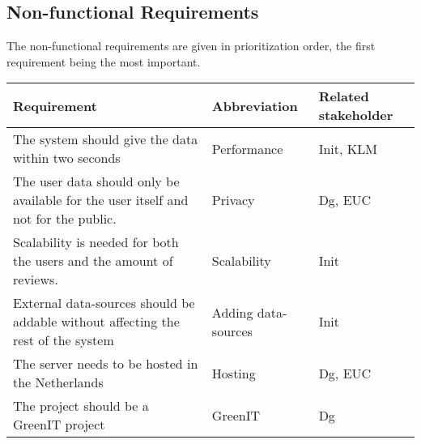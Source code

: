 \subsection*{Non-functional Requirements}
The non-functional requirements are given in prioritization order, the first requirement being the most important. 

\begin{longtable}{| p{10cm}| l | l |}
\hline
\textbf{Requirement} & \textbf{Abbreviation} & \textbf{Related stakeholder} \\ \hline
The system should give the data within two seconds & Performance & Init, KLM \\ \hline
The user data should only be available for the user itself and not for the public. & Privacy & Dg, EUC \\ \hline
Scalability is needed for both the users and the amount of reviews.& Scalability & Init \\ \hline
External data-sources should be addable without affecting the rest of the system & Adding data-sources & Init \\ \hline
The server needs to be hosted in the Netherlands & Hosting & Dg, EUC \\ \hline
The project should be a GreenIT project & GreenIT & Dg \\ \hline
\end{longtable}
